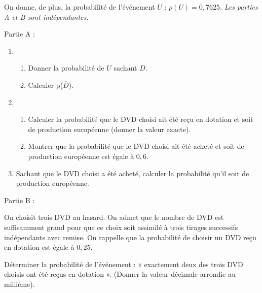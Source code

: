 \par
On donne, de plus, la probabilité de l'événement $U$ : $p\left(U\right)=0,7625$.
\textit{Les parties A et B sont indépendantes.}
\begin{h3}Partie A :\end{h3}
\begin{enumerate}
     \item
     \begin{enumerate}[label=\alph*.]
          \item
          Donner la probabilité de $U$ sachant $D$.
          \item
          Calculer p($\overline{D}$).
     \end{enumerate}
     \item
     \begin{enumerate}[label=\alph*.]
          \item
          Calculer la probabilité que le DVD choisi ait été reçu en dotation et soit de production européenne (donner la valeur exacte).
          \item
          Montrer que la probabilité que le DVD choisi ait été acheté et soit de production européenne est égale à $0,6$.
     \end{enumerate}
     \item
     Sachant que le DVD choisi a été acheté, calculer la probabilité qu'il soit de production européenne.
\end{enumerate}
\begin{h3}Partie B :\end{h3}
On choisit trois DVD au hasard. On admet que le nombre de DVD est suffisamment grand pour que ce choix soit assimilé à trois tirages successifs indépendants avec remise. On rappelle que la probabilité de choisir un DVD reçu en dotation est égale à $0,25$.
\par
Déterminer la probabilité de l'événement : « exactement deux des trois DVD choisis ont été reçus en dotation ». (Donner la valeur décimale arrondie au millième). 
